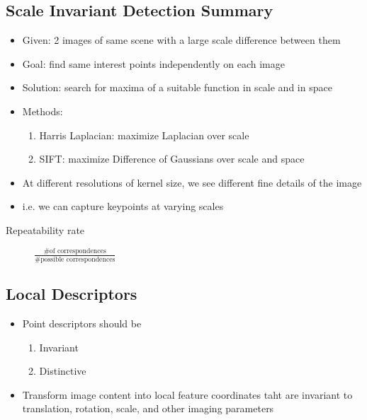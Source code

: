 \documentclass[letterpaper,12pt]{article}
\begin{document}
\subsection{Scale Invariant Detection Summary}
\begin{itemize}
 \item Given: 2 images of same scene with a large scale difference between them
 \item Goal: find same interest points independently on each image
 \item Solution: search for maxima of a suitable function in scale and in space
 \item Methods:
       \begin{enumerate}
        \item Harris Laplacian: maximize Laplacian over scale
        \item SIFT: maximize Difference of Gaussians over scale and space
       \end{enumerate}
 \item At different resolutions of kernel size, we see different fine details of the image
 \item i.e. we can capture keypoints at varying scales
\end{itemize}
\begin{description}
 \item[Repeatability rate] $\frac{\text{\# of correspondences}}{\text{\# possible correspondences}}$
\end{description}

\subsection{Local Descriptors}
\begin{itemize}
 \item Point descriptors should be
       \begin{enumerate}
        \item Invariant
        \item Distinctive
       \end{enumerate}
 \item Transform image content into local feature coordinates taht are invariant to translation, rotation, scale, and other imaging parameters
\end{itemize}
\end{document}
